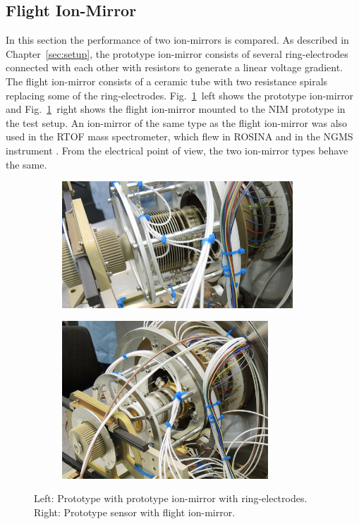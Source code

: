 	\subsection{Flight Ion-Mirror }
	In this section the performance of two ion-mirrors is compared. As described in Chapter~\ref{sec:setup}, the prototype ion-mirror consists of several ring-electrodes connected with each other with resistors to generate a linear voltage gradient. The flight ion-mirror consists of a ceramic tube with two resistance spirals replacing some of the ring-electrodes. Fig.~\ref{fig:ExpRefl}~left shows the prototype ion-mirror and Fig.~\ref{fig:ExpRefl}~right shows the flight ion-mirror mounted to the NIM prototype in the test setup. An ion-mirror of the same type as the flight ion-mirror was also used in the RTOF mass spectrometer, which flew in ROSINA \cite{Diss_Scherer} and in the NGMS instrument \cite{Diss_Hofer}. From the electrical point of view, the two ion-mirror types behave the same.\\
	\begin{figure}[H]
		\begin{subfigure}{0.5\textwidth}
			\centering
			\includegraphics[width = 0.95\textwidth]{Experiments/reflectron_Prototype1.jpg}
		\end{subfigure}
		\begin{subfigure}{0.5\textwidth}
			\centering
			\includegraphics[width = 0.85\textwidth]{Experiments/reflectron_flight.JPG}
		\end{subfigure}
		\caption{Left: Prototype with prototype ion-mirror with ring-electrodes. Right: Prototype sensor with flight ion-mirror.}
		\label{fig:ExpRefl}
	\end{figure}
